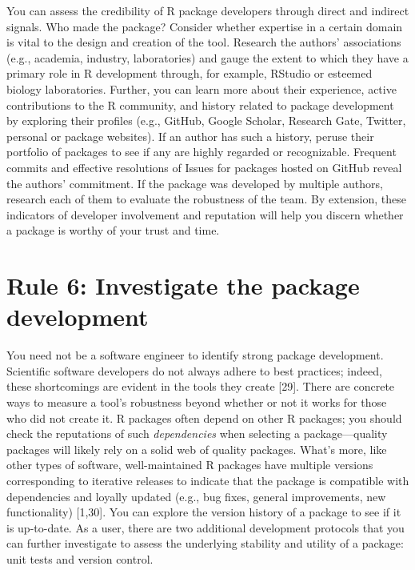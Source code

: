 \documentclass[10pt,letterpaper]{article}
\begin{document}
You can assess the credibility of R package developers through direct
and indirect signals. Who made the package? Consider whether expertise
in a certain domain is vital to the design and creation of the tool.
Research the authors' associations (e.g., academia, industry,
laboratories) and gauge the extent to which they have a primary role in
R development through, for example, RStudio or esteemed biology
laboratories. Further, you can learn more about their experience, active
contributions to the R community, and history related to package
development by exploring their profiles (e.g., GitHub, Google Scholar,
Research Gate, Twitter, personal or package websites). If an author has
such a history, peruse their portfolio of packages to see if any are
highly regarded or recognizable. Frequent commits and effective
resolutions of Issues for packages hosted on GitHub reveal the authors'
commitment. If the package was developed by multiple authors, research
each of them to evaluate the robustness of the team. By extension, these
indicators of developer involvement and reputation will help you discern
whether a package is worthy of your trust and time.

\hypertarget{rule-6-investigate-the-package-development}{%
\section{Rule 6: Investigate the package
development}\label{rule-6-investigate-the-package-development}}

You need not be a software engineer to identify strong package
development. Scientific software developers do not always adhere to best
practices; indeed, these shortcomings are evident in the tools they
create {[}29{]}. There are concrete ways to measure a tool's robustness
beyond whether or not it works for those who did not create it. R
packages often depend on other R packages; you should check the
reputations of such \emph{dependencies} when selecting a
package---quality packages will likely rely on a solid web of quality
packages. What's more, like other types of software, well-maintained R
packages have multiple versions corresponding to iterative releases to
indicate that the package is compatible with dependencies and loyally
updated (e.g., bug fixes, general improvements, new functionality)
{[}1,30{]}. You can explore the version history of a package to see if
it is up-to-date. As a user, there are two additional development
protocols that you can further investigate to assess the underlying
stability and utility of a package: unit tests and version control.
\end{document}
